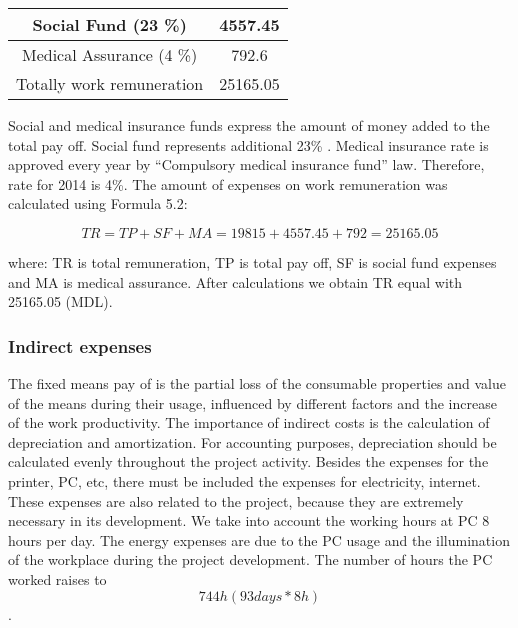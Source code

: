 \begin{table}[]
\begin{tabular}{|c|c|c|c|c|}
\multicolumn{4}{|c|}{Social Fund (23 \%)}                                                                                                                      & 4557.45                                             \\ \hline
\multicolumn{4}{|c|}{Medical Assurance (4 \%)}                                                                                                                 & 792.6                                               \\ \hline
\multicolumn{4}{|c|}{Totally work remuneration}                                                                                                                & 25165.05                                            \\ \hline
\end{tabular}
\end{table}

Social and medical insurance funds express the amount of money added to the total pay off. Social fund represents additional 23\% . Medical insurance rate is approved every year by “Compulsory medical insurance fund” law. Therefore, rate for 2014 is 4\%. The amount of expenses on work remuneration was calculated using Formula 5.2:

\begin{equation}
	TR=TP+SF+MA=19815+4557.45+792=25165.05
\end{equation}

 where: TR is total remuneration, TP is total pay off, SF is social fund expenses and MA is medical assurance. After calculations we obtain TR equal with 25165.05 (MDL).

\subsubsection{Indirect expenses}

The fixed means pay of is the partial loss of the consumable properties and value of the means during their usage, influenced by different factors and the increase of the work productivity. The importance of indirect costs is the calculation of depreciation and amortization. For accounting purposes, depreciation should be calculated evenly throughout the project activity.  Besides the expenses for the printer, PC, etc, there must be included the expenses for electricity, internet. These expenses are also related to the project, because they are extremely necessary in its development. We take into account the working hours at PC 8 hours per day.  The energy expenses are due to the PC usage and the illumination of the workplace during the project development. The number of hours the PC worked raises to \[744h (93 days * 8 h)\].


